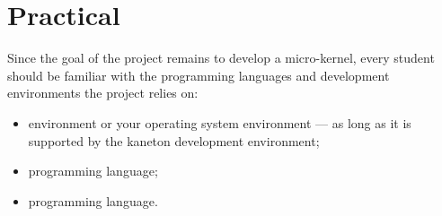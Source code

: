 \section{Practical}

Since the goal of the project remains to develop a micro-kernel, every
student should be familiar with the programming languages and
development environments the project relies on:

\begin{itemize}
  \item
     environment or your operating system environment --- as
    long as it is supported by the kaneton development environment;
  \item
     programming language;
  \item
     programming language.
\end{itemize}
